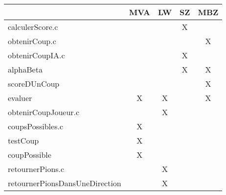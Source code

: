 \begin{table}[h]
\centering
\begin{tabular}{l|c|c|c|c|}

\cline{2-5}
& MVA & LW & SZ & MBZ \\ \hline
\multicolumn{1}{|l|}{calculerScore.c}                   &                       &                & X                     &                        \\ \hline
\multicolumn{1}{|l|}{obtenirCoup.c}                     &                       &                &                       & X                      \\ \hline
\multicolumn{1}{|l|}{obtenirCoupIA.c}                   &                       &                & X                     &                        \\ \hline
\multicolumn{1}{|l|}{alphaBeta}                         &                       &                & X                      & X                      \\ \hline
\multicolumn{1}{|l|}{scoreDUnCoup}                      &                       &                &                       & X                      \\ \hline
\multicolumn{1}{|l|}{evaluer}                           & X                      & X               &                       & X                      \\ \hline
\multicolumn{1}{|l|}{obtenirCoupJoueur.c}               &                       & X              &                       &                        \\ \hline
\multicolumn{1}{|l|}{coupsPossibles.c}                  & X                     &                &                       &                        \\ \hline
\multicolumn{1}{|l|}{testCoup}                          & X                     &                &                       &                        \\ \hline
\multicolumn{1}{|l|}{coupPossible}                      & X                     &                &                       &                        \\ \hline
\multicolumn{1}{|l|}{retournerPions.c}                  &                       & X              &                       &                        \\ \hline
\multicolumn{1}{|l|}{retournerPionsDansUneDirection}    &                       & X              &                       &                        \\ \hline

\end{tabular}
\end{table}
